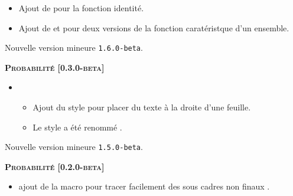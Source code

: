 \documentclass[12pt,a4paper]{book}
\begin{document}
\begin{description}
\begin{itemize}[itemsep=.5em]
    \begin{itemize}[itemsep=.5em]
        \item Ajout de  pour la fonction identité.

        \item Ajout de  et  pour deux versions de la fonction caratéristque d'un ensemble.
    \end{itemize}
\end{itemize}


\separation

\end{description}\begin{description}
\medskip
\item[2020-07-25] Nouvelle version mineure \verb+1.6.0-beta+.




\begin{center}
    \textbf{\textsc{Probabilité [0.3.0-beta]}}
\end{center}

\begin{itemize}[itemsep=.5em]
    \item {}
    \begin{itemize}[itemsep=.5em]
        \item Ajout du style  pour placer du texte à la droite d'une feuille.

        \item Le style  a été renommé .
    \end{itemize}

    
\end{itemize}


\separation

\end{description}\begin{description}
\medskip
\item[2020-07-23] Nouvelle version mineure \verb+1.5.0-beta+.




\begin{center}
    \textbf{\textsc{Probabilité [0.2.0-beta]}}
\end{center}

\begin{itemize}[itemsep=.5em]
    \item {}
          ajout de la macro  pour tracer facilement des sous cadres non \og finaux \fg.


\end{itemize}
\end{description}
\end{document}
